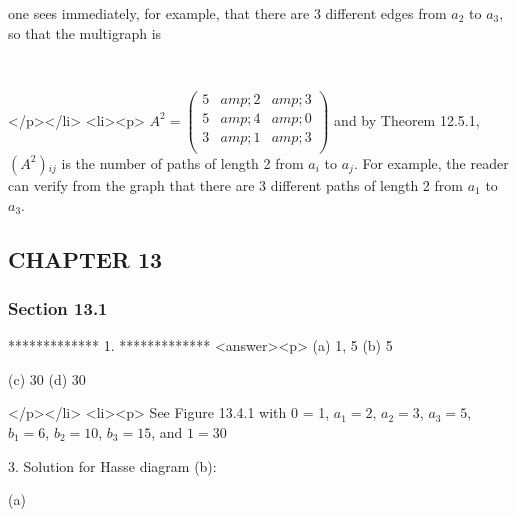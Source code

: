 one sees immediately, for example, that there are 3 different edges from \(a_2\) to \(a_3\), so that the multigraph is

\begin{doublespace}
\noindent\(\)
\end{doublespace}

</p></li>
<li><p>  \(A^2= \left(
\begin{array}{ccc}
 5 &amp; 2 &amp; 3 \\
 5 &amp; 4 &amp; 0 \\
 3 &amp; 1 &amp; 3 \\
\end{array}
\right)\)  and by Theorem 12.5.1, \(\left(A^2\right){}_{i j}\)  is the number of paths of length 2 from \(a_i\) to \(a_j\). For example, the
reader can verify from the graph that there are 3 different paths of length 2 from \(a_1\) to \(a_3\).


\subsection{CHAPTER 13}


\subsubsection{Section 13.1}

*************
1.
*************
<answer><p> (a) 1, 5  (b) 5 $\quad \quad $



    (c) 30  (d) 30 

</p></li>
<li><p> See Figure 13.4.1 with  0 = 1, \(a_1=2\), \(a_2 = 3\), \(a_3=5\), \(b_1=6\), \(b_2=10\), \(b_3= 15\), and \(1=30\)



 3. Solution for Hasse diagram (b):



(a)




